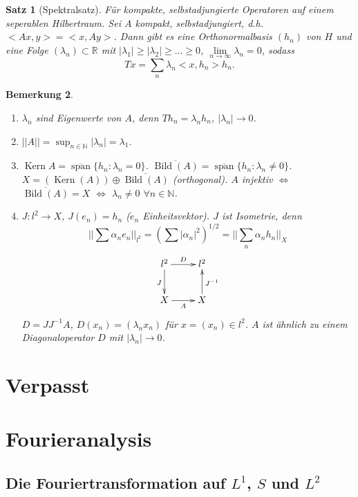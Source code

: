 \documentclass[11pt,a4paper,titlepage, ngerman]{scrartcl}
\newtheorem{Satz}{Satz}[section]
\newtheorem{Bemerkung}[Satz]{Bemerkung}
\DeclareMathOperator{\Kern}{Kern}
\DeclareMathOperator{\Bild}{Bild}
\DeclareMathOperator{\spann}{span}
\numberwithin{equation}{section}
\newcommand{\R}{\mathbb{R}} %
\newcommand{\N}{\mathbb{N}} %
\begin{document}
	\begin{Satz}[Spektralsatz]
		Für kompakte, selbstadjungierte Operatoren auf einem seperablen Hilbertraum.
		Sei $A$ kompakt, selbstadjungiert, d.h. $<Ax, y> = <x, Ay>$. Dann gibt es eine Orthonormalbasis $(h_n)$ von $H$ und eine Folge $(\lambda_n)\subset\R$ mit $|\lambda_1|\geq |\lambda_2|\geq...\geq 0$, $\lim\limits_{n\rightarrow\infty} \lambda_n = 0$, sodass
		$$ Tx= \sum_n \lambda_n<x,h_n>h_n.$$
	\end{Satz}
	
	\begin{Bemerkung}~
		\begin{enumerate}
			\item[a)] $\lambda_n$ sind Eigenwerte von $A$, denn $Th_n = \lambda_nh_n$, $|\lambda_n|\rightarrow 0$.
			\item[b)] $||A|| = \sup_{n\in \N}|\lambda_n| = \lambda_1$.
			\item[c)] $\Kern A = \overline{\spann}\{h_n:\lambda_n = 0 \}$. $\overline{\Bild(A)} = \overline{\spann}\{h_n: \lambda_n\neq 0\}$. $X = (\Kern(A))\oplus\overline{\Bild(A)}$ (orthogonal). $A$ injektiv $\Leftrightarrow$ $\overline{\Bild(A)} = X$ $\Leftrightarrow$ $\lambda_n \neq 0$ $\forall n\in \N$.
			\item[d)] $J:l^2\rightarrow X$, $J(e_n) = h_n$ ($e_n$ Einheitsvektor). $J$ ist Isometrie, denn
			$$||\sum \alpha_n e_n||_{l^2} = (\sum |\alpha_n|^2)^{1/2} = ||\sum_n \alpha_n h_n||_X$$
			$$\xymatrix{
				l^2\ar[r]^D \ar[d]_J & l^2\\
				X\ar[r]_A & X\ar[u]_{J^{-1}}
				}$$
			$D = JJ^{-1}A$, $D(x_n) = (\lambda_n x_n)$ für $x= (x_n) \in l^2$. $A$ ist ähnlich zu einem Diagonaloperator $D$ mit $|\lambda_n|\rightarrow 0$.
		\end{enumerate}
	\end{Bemerkung}
	
	\section{Verpasst}
	
	\newpage
	\section{Fourieranalysis}
	
	\subsection{Die Fouriertransformation auf $L^1$, $S$ und $L^2$}
	
\end{document}
